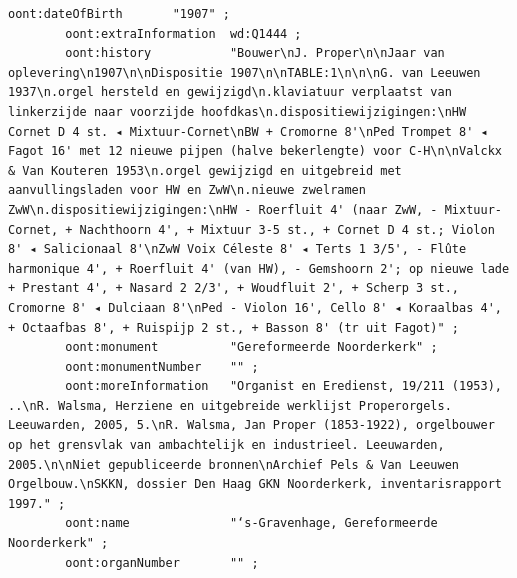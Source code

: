 \begin{lstlisting}[caption={Part14\_000GravenhageNoorderkerk}]
        oont:dateOfBirth       "1907" ;
        oont:extraInformation  wd:Q1444 ;
        oont:history           "Bouwer\nJ. Proper\n\nJaar van oplevering\n1907\n\nDispositie 1907\n\nTABLE:1\n\n\nG. van Leeuwen 1937\n.orgel hersteld en gewijzigd\n.klaviatuur verplaatst van linkerzijde naar voorzijde hoofdkas\n.dispositiewijzigingen:\nHW Cornet D 4 st. ◂ Mixtuur-Cornet\nBW + Cromorne 8'\nPed Trompet 8' ◂ Fagot 16' met 12 nieuwe pijpen (halve bekerlengte) voor C-H\n\nValckx & Van Kouteren 1953\n.orgel gewijzigd en uitgebreid met aanvullingsladen voor HW en ZwW\n.nieuwe zwelramen ZwW\n.dispositiewijzigingen:\nHW - Roerfluit 4' (naar ZwW, - Mixtuur-Cornet, + Nachthoorn 4', + Mixtuur 3-5 st., + Cornet D 4 st.; Violon 8' ◂ Salicionaal 8'\nZwW Voix Céleste 8' ◂ Terts 1 3/5', - Flûte harmonique 4', + Roerfluit 4' (van HW), - Gemshoorn 2'; op nieuwe lade + Prestant 4', + Nasard 2 2/3', + Woudfluit 2', + Scherp 3 st., Cromorne 8' ◂ Dulciaan 8'\nPed - Violon 16', Cello 8' ◂ Koraalbas 4', + Octaafbas 8', + Ruispijp 2 st., + Basson 8' (tr uit Fagot)" ;
        oont:monument          "Gereformeerde Noorderkerk" ;
        oont:monumentNumber    "" ;
        oont:moreInformation   "Organist en Eredienst, 19/211 (1953), ..\nR. Walsma, Herziene en uitgebreide werklijst Properorgels. Leeuwarden, 2005, 5.\nR. Walsma, Jan Proper (1853-1922), orgelbouwer op het grensvlak van ambachtelijk en industrieel. Leeuwarden, 2005.\n\nNiet gepubliceerde bronnen\nArchief Pels & Van Leeuwen Orgelbouw.\nSKKN, dossier Den Haag GKN Noorderkerk, inventarisrapport 1997." ;
        oont:name              "‘s-Gravenhage, Gereformeerde Noorderkerk" ;
        oont:organNumber       "" ;

\end{lstlisting}
